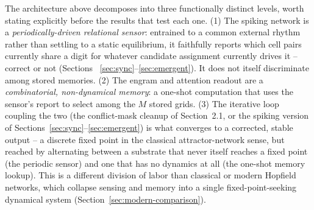\documentclass[11pt]{article}
\begin{document}
The architecture above decomposes into three functionally distinct levels, worth stating
explicitly before the results that test each one. (1) The spiking network is a
\emph{periodically-driven relational sensor}: entrained to a common external rhythm rather than
settling to a static equilibrium, it faithfully reports which cell pairs currently share a
digit for whatever candidate assignment currently drives it -- correct or not (Sections~
\ref{sec:sync}--\ref{sec:emergent}). It does not itself discriminate among stored memories. (2)
The engram and attention readout are a \emph{combinatorial, non-dynamical memory}: a one-shot
computation that uses the sensor's report to select among the $M$ stored grids. (3) The
iterative loop coupling the two (the conflict-mask cleanup of Section~2.1, or the spiking
version of Sections~\ref{sec:sync}--\ref{sec:emergent})
is what converges to a corrected, stable output -- a discrete fixed point in the classical
attractor-network sense, but reached by alternating between a substrate that never itself
reaches a fixed point (the periodic sensor) and one that has no dynamics at all (the one-shot
memory lookup). This is a different division of labor than classical or modern Hopfield
networks, which collapse sensing and memory into a single fixed-point-seeking dynamical
system (Section~\ref{sec:modern-comparison}).
\end{document}
